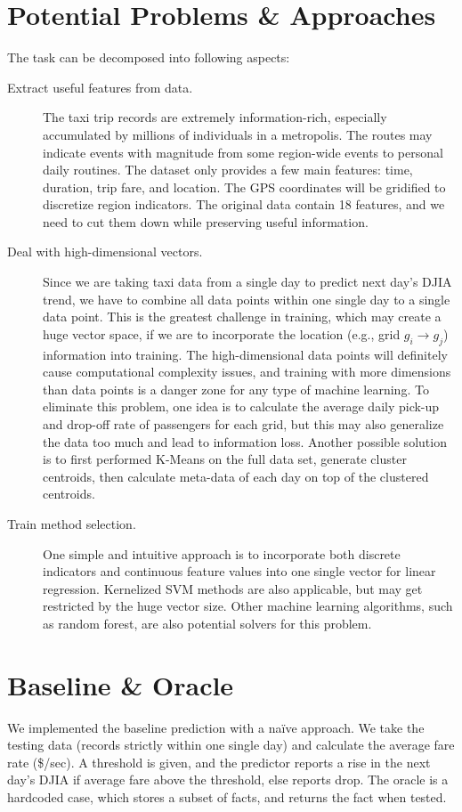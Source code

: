 \documentclass[a4paper]{article}
\begin{document}
\section{Potential Problems \& Approaches}
The task can be decomposed into following aspects:
\begin{description}
\item[Extract useful features from data.] The taxi trip records are extremely information-rich, especially accumulated by millions of individuals in a metropolis. The routes may indicate events with magnitude from some region-wide events to personal daily routines. The dataset only provides a few main features: time, duration, trip fare, and location. The GPS coordinates will be gridified to discretize region indicators. The original data contain 18 features, and we need to cut them down while preserving useful information.
\item[Deal with high-dimensional vectors.] Since we are taking taxi data from a single day to predict next day's DJIA trend, we have to combine all data points within one single day to a single data point. This is the greatest challenge in training, which may create a huge vector space, if we are to incorporate the location (e.g., grid $g_i\to g_j$) information into training. The high-dimensional data points will definitely cause computational complexity issues, and training with more dimensions than data points is a danger zone for any type of machine learning. To eliminate this problem, one idea is to calculate the average daily pick-up and drop-off rate of passengers for each grid, but this may also generalize the data too much and lead to information loss. Another possible solution is to first performed K-Means on the full data set, generate cluster centroids, then calculate meta-data of each day on top of the clustered centroids.
\item[Train method selection.] One simple and intuitive approach is to incorporate both discrete indicators and continuous feature values into one single vector for linear regression. Kernelized SVM methods are also applicable, but may get restricted by the huge vector size. Other machine learning algorithms, such as random forest, are also potential solvers for this problem.
\end{description}
\section{Baseline \& Oracle}
We implemented the baseline prediction with a naïve approach. We take the testing data (records strictly within one single day) and calculate the average fare rate (\$/sec). A threshold is given, and the predictor reports a rise in the next day's DJIA if average fare above the threshold, else reports drop. The oracle is a hardcoded case, which stores a subset of facts, and returns the fact when tested.
\end{document}
